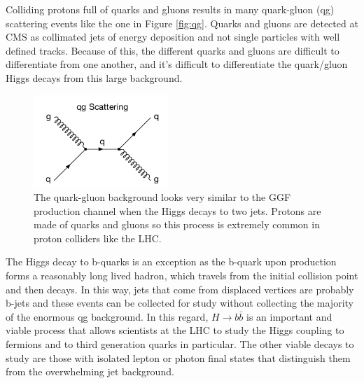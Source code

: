 Colliding protons full of quarks and gluons results in many quark-gluon (qg) scattering events like the one in Figure \ref{fig:qg}. Quarks and gluons are detected at CMS as collimated jets of energy deposition and not single particles with well defined tracks. Because of this, the different quarks and gluons are difficult to differentiate from one another, and it's difficult to differentiate the quark/gluon Higgs decays from this large background. 
\begin{figure}[h!]
\label{fig:qg}
  \centering
  \includegraphics[width=2in]{images/qg_scattering.png}
  \caption
   {The quark-gluon background looks very similar to the GGF production channel when the Higgs decays to two jets. Protons are made of quarks and gluons so this process is extremely common in proton colliders like the LHC.}
  \label{fig:feynqg}
\end{figure}
The Higgs decay to b-quarks is an exception as the b-quark upon production forms a reasonably long lived hadron, which travels from the initial collision point and then decays. In this way, jets that come from displaced vertices are probably b-jets and these events can be collected for study without collecting the majority of the enormous qg background. In this regard, $H\rightarrow b\bar{b}$ is an important and viable process that allows scientists at the LHC to study the Higgs coupling to fermions and to third generation quarks in particular. The other viable decays to study are those with isolated lepton or photon final states that distinguish them from the overwhelming jet background. 
